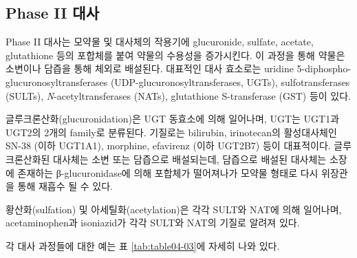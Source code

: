 \documentclass[
  11pt,
  krantz2, a4paper, twoside]{krantz}
\begin{document}
\hypertarget{phase-ii-uxb300uxc0ac}{%
\subsection{Phase II 대사}\label{phase-ii-uxb300uxc0ac}}

Phase II 대사는 모약물 및 대사체의 작용기에 glucuronide, sulfate,
acetate, glutathione 등의 포합체를 붙여 약물의 수용성을 증가시킨다. 이
과정을 통해 약물은 소변이나 담즙을 통해 체외로 배설된다. 대표적인 대사
효소로는 uridine 5\textquotesingle-diphospho-glucuronosyltransferases
(UDP-glucuronosyltransferases, UGTs), sulfotransferases (SULTs),
\emph{N}-acetyltransferases (NATs), glutathione S-transferase (GST) 등이
있다.

글루크론산화(glucuronidation)은 UGT 동효소에 의해 일어나며, UGT는 UGT1과
UGT2의 2개의 family로 분류된다. 기질로는 bilirubin, irinotecan의
활성대사체인 SN-38 (이하 UGT1A1), morphine, efavirenz (이하 UGT2B7) 등이
대표적이다. 글루크론산화된 대사체는 소변 또는 담즙으로 배설되는데,
담즙으로 배설된 대사체는 소장에 존재하는 β-glucuronidase에 의해 포합체가
떨어져나가 모약물 형태로 다시 위장관을 통해 재흡수 될 수 있다.

황산화(sulfation) 및 아세틸화(acetylation)은 각각 SULT와 NAT에 의해
일어나며, acetaminophen과 isoniazid가 각각 SULT와 NAT의 기질로 알려져
있다.

각 대사 과정들에 대한 예는 표 \ref{tab:table04-03}에 자세히 나와 있다.
\end{document}
